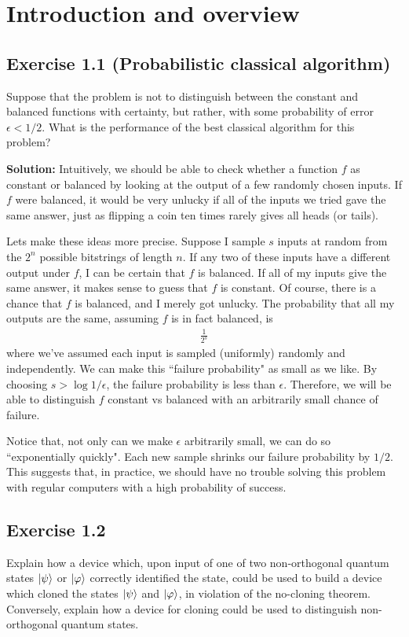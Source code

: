 \documentclass{book}
\begin{document}
\chapter{Introduction and overview}

\section*{Exercise 1.1 (Probabilistic classical algorithm)}
    Suppose that the problem is not to distinguish between the constant and balanced functions with certainty, but rather, with some probability of error $\epsilon < 1/2$. What is the performance of the best classical algorithm for this problem?
    
    \textbf{Solution:} Intuitively, we should be able to check whether a function $f$ as constant or balanced by looking at the output of a few randomly chosen inputs. If $f$ were balanced, it would be very unlucky if all of the inputs we tried gave the same answer, just as flipping a coin ten times rarely gives all heads (or tails).
    
    Lets make these ideas more precise. Suppose I sample $s$ inputs at random from the $2^n$ possible bitstrings of length $n$. If any two of these inputs have a different output under $f$, I can be certain that $f$ is balanced. If all of my inputs give the same answer, it makes sense to guess that $f$ is constant. Of course, there is a chance that $f$ is balanced, and I merely got unlucky. The probability that all my outputs are the same, assuming $f$ is in fact balanced, is 
    \begin{align}
        \frac{1}{2^s}
    \end{align}
    where we've assumed each input is sampled (uniformly) randomly and independently. We can make this ``failure probability" as small as we like. By choosing $s > \log 1/\epsilon$, the failure probability is less than $\epsilon$. Therefore, we will be able to distinguish $f$ constant vs balanced with an arbitrarily small chance of failure.

    Notice that, not only can we make $\epsilon$ arbitrarily small, we can do so ``exponentially quickly". Each new sample shrinks our failure probability by $1/2$. This suggests that, in practice, we should have no trouble solving this problem with regular computers with a high probability of success.
    
\section*{Exercise 1.2}
    Explain how a device which, upon input of one of two non-orthogonal quantum states $\ket{\psi}$ or $\ket{\varphi}$ correctly identified the state, could be used to build a device which cloned the states $\ket{\psi}$ and $\ket{\varphi}$, in violation of the no-cloning theorem. Conversely, explain how a device for cloning could be used to distinguish non-orthogonal quantum states.
    
\end{document}
